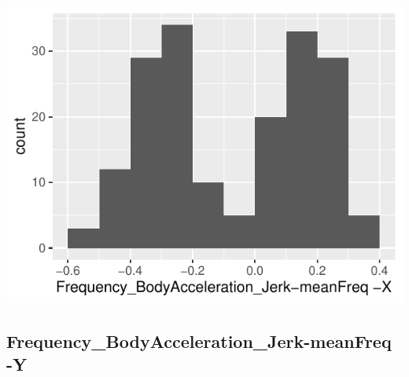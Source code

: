 \documentclass[
]{article}
\begin{document}
\begin{minipage}{0.25 \textwidth}

\includegraphics{codebook_tidydatasub_files/figure-latex/Var-58-Frequency-BodyAcceleration-Jerk-meanFreq--X-1.pdf}

\end{minipage}

\noindent\makebox[\linewidth]{\rule{\textwidth}{0.4pt}}

\hypertarget{frequency_bodyacceleration_jerk-meanfreq--y}{%
\subsection{Frequency\_BodyAcceleration\_Jerk-meanFreq
-Y}\label{frequency_bodyacceleration_jerk-meanfreq--y}}
\end{document}
